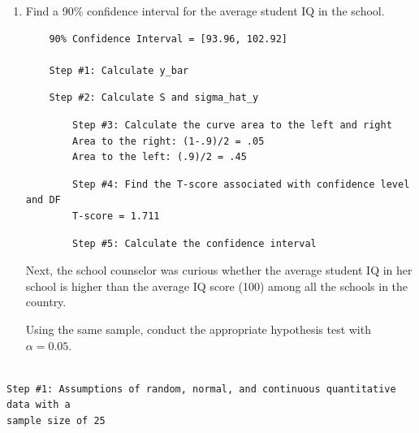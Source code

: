 \documentclass[12pt,letterpaper]{article}
\begin{document}
\begin{enumerate}
	\item Find a 90\% confidence interval for the average student IQ in the school.\\
	\begin{verbatim}
	90% Confidence Interval = [93.96, 102.92]
	
	Step #1: Calculate y_bar
	\end{verbatim}
	
	
	
	\begin{verbatim}
	Step #2: Calculate S and sigma_hat_y
	\end{verbatim}

	
		\begin{verbatim}
		Step #3: Calculate the curve area to the left and right 
		Area to the right: (1-.9)/2 = .05
		Area to the left: (.9)/2 = .45
	\end{verbatim}
	
	\begin{verbatim}
		Step #4: Find the T-score associated with confidence level and DF
		T-score = 1.711
	\end{verbatim} 
	
		\begin{verbatim}
		Step #5: Calculate the confidence interval
	\end{verbatim} 
	
	\vspace{1cm}
	
	 Next, the school counselor was curious  whether the average student IQ in her school is higher than the average IQ score (100) among all the schools in the country.
	
	\noindent Using the same sample, conduct the appropriate hypothesis test with $\alpha=0.05$.
\end{enumerate}

\begin{verbatim}
	 
Step #1: Assumptions of random, normal, and continuous quantitative data with a 
sample size of 25
\end{verbatim}

\end{document}
